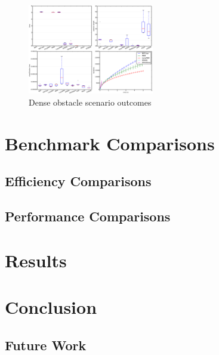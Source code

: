 \documentclass[conference]{IEEEtran} \usepackage[T1]{fontenc} \usepackage[backend=biber, style=ieee]{biblatex}
\begin{document}
\begin{figure}
\label{figure16} 
\centering 
\includegraphics[width=0.49\textwidth]{s3_outcomes}
\caption{Dense obstacle scenario outcomes}
\end{figure}

\section{Benchmark Comparisons} \label{Benchmark Comparison}


\subsection{Efficiency Comparisons} \label{Efficiency Comparisons}

\subsection{Performance Comparisons} \label{Performance Comparisons}

\section{Results} \label{Results}

\section{Conclusion} \label{Conclusion}

\subsection{Future Work}

\printbibliography
\end{document}
